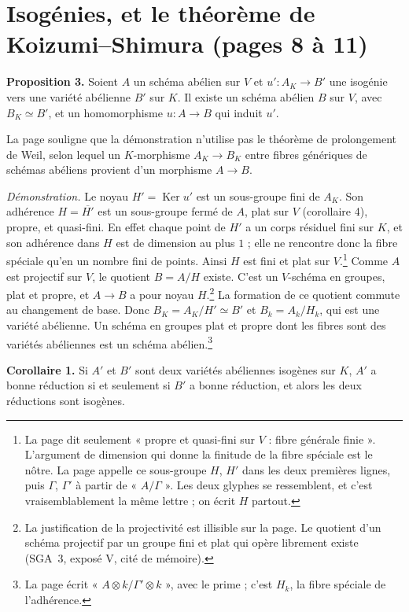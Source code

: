 \documentclass[11pt,a4paper]{article}
\begin{document}
\section*{Isogénies, et le théorème de Koizumi--Shimura (pages 8 à 11)}

\textbf{Proposition 3.} Soient $A$ un schéma abélien sur $V$ et
$u' \colon A_K \to B'$ une isogénie vers une variété abélienne $B'$ sur $K$.
Il existe un schéma abélien $B$ sur $V$, avec $B_K \simeq B'$, et un
homomorphisme $u \colon A \to B$ qui induit $u'$.

La page souligne que la démonstration n'utilise pas le théorème de prolongement
de Weil, selon lequel un $K$-morphisme $A_K \to B_K$ entre fibres génériques de
schémas abéliens provient d'un morphisme $A \to B$.

\emph{Démonstration.} Le noyau $H' = \operatorname{Ker} u'$ est un sous-groupe
fini de $A_K$. Son adhérence $H = \overline{H'}$ est un sous-groupe fermé de
$A$, plat sur $V$ (corollaire 4), propre, et quasi-fini. En effet chaque point
de $H'$ a un corps résiduel fini sur $K$, et son adhérence dans $H$ est de
dimension au plus $1$ ; elle ne rencontre donc la fibre spéciale qu'en un
nombre fini de points. Ainsi $H$ est fini et plat sur $V$.\footnote{La page
dit seulement « propre et quasi-fini sur $V$ : fibre générale finie ».
L'argument de dimension qui donne la finitude de la fibre spéciale est le
nôtre. La page appelle ce sous-groupe $H$, $H'$ dans les deux premières lignes,
puis $\Gamma$, $\Gamma'$ à partir de « $A/\Gamma$ ». Les deux glyphes se
ressemblent, et c'est vraisemblablement la même lettre ; on écrit $H$
partout.} Comme $A$ est projectif sur $V$, le quotient $B = A/H$ existe. C'est
un $V$-schéma en groupes, plat et propre, et $A \to B$ a pour noyau
$H$.\footnote{La justification de la projectivité est illisible sur la page.
Le quotient d'un schéma projectif par un groupe fini et plat qui opère
librement existe (SGA~3, exposé V, cité de mémoire).} La formation de ce
quotient commute au changement de base. Donc $B_K = A_K/H' \simeq B'$ et
$B_k = A_k/H_k$, qui est une variété abélienne. Un schéma en groupes plat et
propre dont les fibres sont des variétés abéliennes est un schéma
abélien.\footnote{La page écrit « $A \otimes k / \Gamma' \otimes k$ », avec le
prime ; c'est $H_k$, la fibre spéciale de l'adhérence.}

\textbf{Corollaire 1.} Si $A'$ et $B'$ sont deux variétés abéliennes isogènes
sur $K$, $A'$ a bonne réduction si et seulement si $B'$ a bonne réduction, et
alors les deux réductions sont isogènes.
\end{document}
